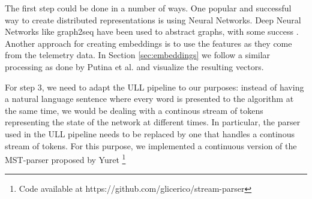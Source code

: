 The first step could be done in a number of ways.
One popular and successful way to create distributed representations is using Neural Networks.
Deep Neural Networks like graph2seq have been used to abstract graphs, with some success 
\cite{venkatakrishnan_graph2seq_2018}.\\

Another approach for creating embeddings is to use the features as they come from the telemetry data.
In Section \ref{sec:embeddings} we follow a similar processing as done by Putina et al.\cite{putina_telemetry-based_2018} and visualize the resulting vectors.

For step 3, we need to adapt the ULL pipeline to our purposes: instead of having a natural language sentence where every word is presented to the algorithm at the same time, we would be dealing with a continous stream of tokens representing the state of the network at different times.
In particular, the parser used in the ULL pipeline needs to be replaced by one that handles a continous stream of tokens.
For this purpose, we implemented a continuous version of the MST-parser proposed by Yuret \cite{yuret_discovery_1998}\footnote{Code available at https://github.com/glicerico/stream-parser}
